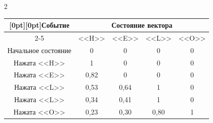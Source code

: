 \begin{multicols}{2}
\begin{center} 


{\small

\tabcolsep=7.5pt

\begin{tabular}{|c|c|c|c|c|}

\hline

\multicolumn{1}{|c|}{\raisebox{-6pt}[0pt][0pt]{Событие}} & \multicolumn{4}{c|}{Состояние вектора} \\

\cline{2-5}

& <<{\sf H}>> & <<{\sf E}>> & {<<{\sf L}>>} & {<<{\sf O}>>} \\

\hline

Начальное состояние & 0\hphantom{,99} & 0\hphantom{,99} & 0\hphantom{,99} & 0 \\


Нажата <<{\sf H}>> & 1\hphantom{,99} & 0\hphantom{,99} & 0\hphantom{,99} & 0 \\


Нажата <<{\sf E}>> & 0,82 & 0\hphantom{,99} & 0\hphantom{,99} & 0 \\


Нажата {<<{\sf L}>>} & 0,53 & 0,64 & 1\hphantom{,99} & 0 \\


Нажата {<<{\sf L}>>} & 0,34 & 0,41 & 1\hphantom{,99} & 0 \\


Нажата <<{\sf O}>> & 0,23 & 0,30 & 0,80 & 1 \\

\hline

\end{tabular}}

\end{center}



\setcounter{figure}{1}

\begin{figure}[b] %

\vspace*{9pt}


\end{figure}
\end{multicols}
